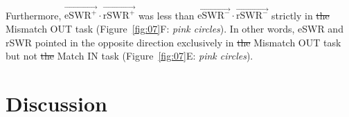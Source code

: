 \documentclass[final,3p,times,twocolumn]{elsarticle}
\providecommand{\DIFdeltex}[1]{{\protect\color{red}\sout{#1}}}                      %
\providecommand{\DIFaddbegin}{} %
\providecommand{\DIFaddend}{} %
\providecommand{\DIFdelbegin}{} %
\providecommand{\DIFdelend}{} %
\providecommand{\DIFdel}[1]{\texorpdfstring{\DIFdeltex{#1}}{}} %
\newcommand{\DIFscaledelfig}{0.5}
\newlength{\DIFdelgraphicswidth} %
\newlength{\DIFdelgraphicsheight} %
\newcommand{\DIFaddincludegraphics}[2][]{{\color{blue}\fbox{\DIFOincludegraphics[#1]{#2}}}} %
\newcommand{\DIFdelincludegraphics}[2][]{%
\sbox{\DIFdelgraphicsbox}{\DIFOincludegraphics[#1]{#2}}%
\settoboxwidth{\DIFdelgraphicswidth}{\DIFdelgraphicsbox} %
\settoboxtotalheight{\DIFdelgraphicsheight}{\DIFdelgraphicsbox} %
\scalebox{\DIFscaledelfig}{%
\parbox[b]{\DIFdelgraphicswidth}{\usebox{\DIFdelgraphicsbox}\\[-\baselineskip] \rule{\DIFdelgraphicswidth}{0em}}\llap{\resizebox{\DIFdelgraphicswidth}{\DIFdelgraphicsheight}{%
\setlength{\unitlength}{\DIFdelgraphicswidth}%
\begin{picture}(1,1)%
\thicklines\linethickness{2pt} %
{\color[rgb]{1,0,0}\put(0,0){\framebox(1,1){}}}%
{\color[rgb]{1,0,0}\put(0,0){\line( 1,1){1}}}%
{\color[rgb]{1,0,0}\put(0,1){\line(1,-1){1}}}%
\end{picture}%
}\hspace*{3pt}}} %
} %
\DeclareRobustCommand{\DIFaddbegin}{\DIFOaddbegin \let\includegraphics\DIFaddincludegraphics} %
\DeclareRobustCommand{\DIFaddend}{\DIFOaddend \let\includegraphics\DIFOincludegraphics} %
\DeclareRobustCommand{\DIFdelbegin}{\DIFOdelbegin \let\includegraphics\DIFdelincludegraphics} %
\DeclareRobustCommand{\DIFdelend}{\DIFOaddend \let\includegraphics\DIFOincludegraphics} %
\begin{document}
\DIFdelend \DIFaddbegin \\
\indent
\DIFaddend Furthermore, $\overrightarrow{\mathrm{eSWR^+}} \cdot \overrightarrow{\mathrm{rSWR^+}}$ was less than $\overrightarrow{\mathrm{eSWR^-}} \cdot \overrightarrow{\mathrm{rSWR^-}}$ strictly in \DIFdelbegin \DIFdel{the }\DIFdelend Mismatch OUT task (Figure~\ref{fig:07}F: \textit{pink circles}). In other words, eSWR and rSWR pointed in the opposite direction exclusively in \DIFdelbegin \DIFdel{the }\DIFdelend Mismatch OUT task but not \DIFdelbegin \DIFdel{the }\DIFdelend Match IN task (Figure~\ref{fig:07}E: \textit{pink circles}).
\label{sec:results}
\section{Discussion}
\end{document}
